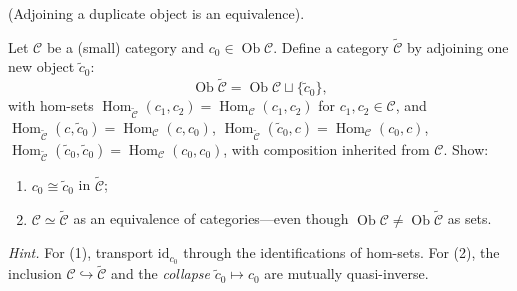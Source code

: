 \documentclass[11pt,a4paper]{article}
\newcounter{problem}
\begin{document}
	\begin{problembox}[2]
		\label{prob.2}
		(Adjoining a duplicate object is an equivalence).
		
		Let $\mathcal{C}$ be a (small) category and
		$c_0\in\operatorname{Ob}\mathcal{C}$. Define a category
		$\widetilde{\mathcal{C}}$ by adjoining one new object
		$\widetilde{c}_0$:
		\[
		\operatorname{Ob}\widetilde{\mathcal{C}}
		=
		\operatorname{Ob}\mathcal{C}
		\sqcup\{\widetilde{c}_0\},
		\]
		with hom-sets
		$\operatorname{Hom}_{\widetilde{\mathcal{C}}}(c_1,c_2)
		=\operatorname{Hom}_{\mathcal{C}}(c_1,c_2)$
		for $c_1,c_2\in\mathcal{C}$, and
		$\operatorname{Hom}_{\widetilde{\mathcal{C}}}(c,\widetilde{c}_0)
		=\operatorname{Hom}_{\mathcal{C}}(c,c_0)$,
		$\operatorname{Hom}_{\widetilde{\mathcal{C}}}(\widetilde{c}_0,c)
		=\operatorname{Hom}_{\mathcal{C}}(c_0,c)$,
		$\operatorname{Hom}_{\widetilde{\mathcal{C}}}
		(\widetilde{c}_0,\widetilde{c}_0)
		=\operatorname{Hom}_{\mathcal{C}}(c_0,c_0)$,
		with composition inherited from $\mathcal{C}$. Show:
		\begin{enumerate}
			\item $c_0\cong\widetilde{c}_0$ in $\widetilde{\mathcal{C}}$;
			
			\item $\mathcal{C}\simeq\widetilde{\mathcal{C}}$ as an
			equivalence of categories---even though
			$\operatorname{Ob}\mathcal{C}
			\neq\operatorname{Ob}\widetilde{\mathcal{C}}$ as sets.
		\end{enumerate}
		
		\textit{Hint.} For (1), transport $\mathrm{id}_{c_0}$ through the
		identifications of hom-sets. For (2), the inclusion
		$\mathcal{C}\hookrightarrow\widetilde{\mathcal{C}}$ and the
		\textit{collapse} $\widetilde{c}_0\mapsto c_0$ are mutually quasi-inverse.
	\end{problembox}
\end{document}
